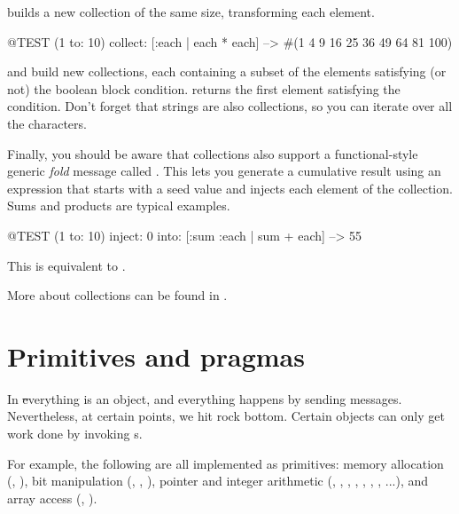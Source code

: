 \documentclass[a4paper,10pt,twoside]{book}
\begin{document}
 builds a new collection of the same size, transforming each element.
\begin{code}{@TEST}
(1 to: 10) collect: [:each | each * each] --> #(1 4 9 16 25 36 49 64 81 100)
\end{code}

 and  build new collections, each containing a subset of the elements satisfying (or not) the boolean block condition.
 returns the first element satisfying the condition.
Don't forget that strings are also collections, so you can iterate over all the characters.


Finally, you should be aware that collections also support a functional-style generic \emph{fold} message called .
This lets you generate a cumulative result using an expression that starts with a seed value and injects each element of the collection.
Sums and products are typical examples.

\begin{code}{@TEST}
(1 to: 10) inject: 0 into: [:sum :each | sum + each] --> 55
\end{code}

\noindent
This is equivalent to .

More about collections can be found in .

\section{Primitives and pragmas}

In \st everything is an object, and everything happens by sending messages.
Nevertheless, at certain points, we hit rock bottom.
Certain objects can only get work done by invoking  s.

For example, the following are all implemented as primitives:
memory allocation (, ),
bit manipulation (, , ),
pointer and integer arithmetic (\ct{+}, \ct{-},  \ct{<},  \ct{>}, \ct{*}, \ct{/ }, \ct{=}, \ct{==}...),
and array access (, ).
\end{document}
